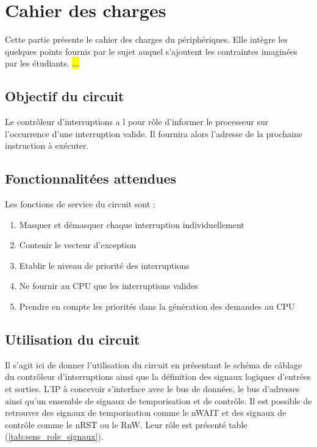 \section{Cahier des charges}
Cette partie présente le cahier des charges du périphériques.
Elle intègre les quelques points fournis par le sujet auquel s'ajoutent les contraintes imaginées par les étudiants.
\hl{...}
\subsection{Objectif du circuit}
Le contrôleur d'interruptions a l pour rôle d'informer le processeur sur l’occurrence d'une interruption valide.
Il fournira alors l’adresse de la prochaine instruction à exécuter.

\subsection{Fonctionnalitées attendues}
Les fonctions de service du circuit sont :
\begin{enumerate}
    \item Masquer et démasquer chaque interruption individuellement
    \item Contenir le vecteur d'exception
    \item Etablir le niveau de priorité des interruptions
    \item Ne fournir au \gls{CPU} que les interruptions valides
    \item Prendre en compte les priorités dans la génération des demandes au \gls{CPU}
\end{enumerate}
\subsection{Utilisation du circuit}
	
Il s'agit ici de donner l'utilisation du circuit en présentant le schéma de câblage du contrôleur d'interruptions ainsi que la définition des signaux logiques d'entrées et sorties.
L'IP à concevoir s'interface avec le bus de données, le bus d'adresses ainsi qu'un ensemble de signaux de temporisation et de contrôle.
Il est possible de retrouver des signaux de temporisation comme le nWAIT et des signaux de contrôle comme le nRST ou le RnW.
Leur rôle est présenté table (\ref{tab:sens_role_signaux}).
	
